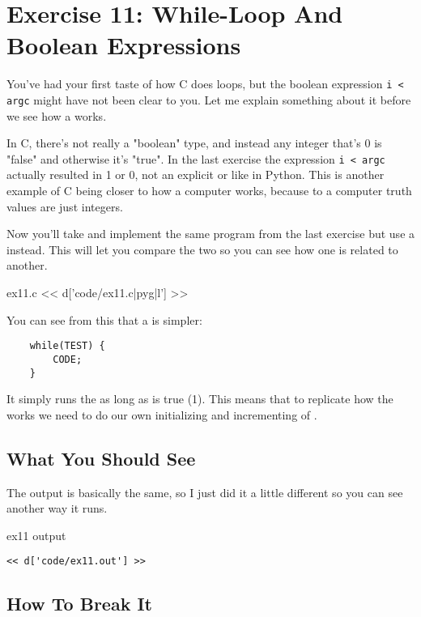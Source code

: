 \chapter{Exercise 11: While-Loop And Boolean Expressions}

You've had your first taste of how C does loops, but the boolean
expression \verb|i < argc| might have not been clear to you.  Let me
explain something about it before we see how a  
works.

In C, there's not really a "boolean" type, and instead any integer
that's 0 is "false" and otherwise it's "true".  In the last exercise
the expression \verb|i < argc| actually resulted in 1 or 0, not 
an explicit  or  like in Python.  This is
another example of C being closer to how a computer works, because
to a computer truth values are just integers.

Now you'll take and implement the same program from the last exercise
but use a  instead.  This will let you compare the
two so you can see how one is related to another.

\begin{code}{ex11.c}
<< d['code/ex11.c|pyg|l'] >>
\end{code}

You can see from this that a  is simpler:

\begin{Verbatim}
    while(TEST) {
        CODE;
    }
\end{Verbatim}

It simply runs the  as long as  is true (1).
This means that to replicate how the  works we need to
do our own initializing and incrementing of .

\section{What You Should See}

The output is basically the same, so I just did it a little different
so you can see another way it runs.

\begin{code}{ex11 output}
\begin{lstlisting}
<< d['code/ex11.out'] >>
\end{lstlisting}
\end{code}

\section{How To Break It}

